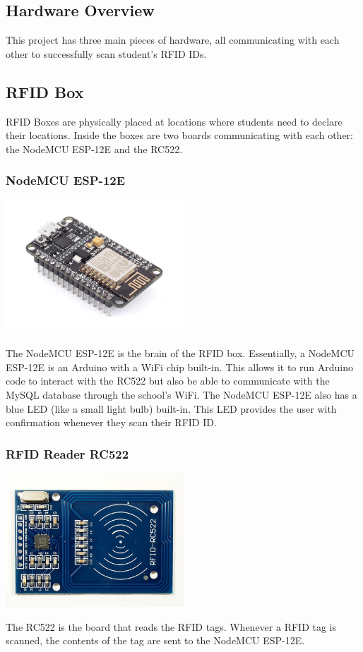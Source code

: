 \documentclass[12pt]{article}
\begin{document}
\begin{spacing}{1.2}
\section{Hardware Overview}

This project has three main pieces of hardware, all communicating with each other to successfully scan student's RFID IDs.

\subsection{RFID Box}

RFID Boxes are physically placed at locations where students need to declare their locations. Inside the boxes are two boards communicating with each other: the NodeMCU ESP-12E and the RC522.

\subsubsection{NodeMCU ESP-12E}
\begin{center}
\includegraphics[height=5cm]{esp-12e.jpg}
\end{center}
The NodeMCU ESP-12E is the brain of the RFID box. Essentially, a NodeMCU ESP-12E is an Arduino with a WiFi chip built-in. This allows it to run Arduino code to interact with the RC522 but also be able to communicate with the MySQL database through the school's WiFi.
\newline\newline
The NodeMCU ESP-12E also has a blue LED (like a small light bulb) built-in. This LED provides the user with confirmation whenever they scan their RFID ID.
\subsubsection{RFID Reader RC522}
\begin{center}
\includegraphics[height=5cm]{RC522.jpg}
\end{center}
The RC522 is the board that reads the RFID tags. Whenever a RFID tag is scanned, the contents of the tag are sent to the NodeMCU ESP-12E.


\end{spacing}
\end{document}
